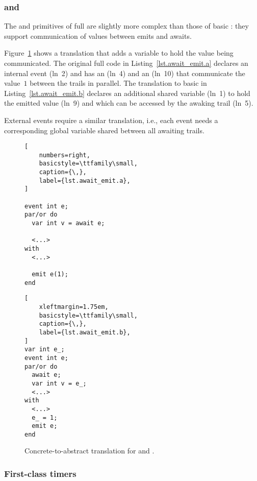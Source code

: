 \subsubsection{ and }

The  and  primitives of full \CEU are slightly more
complex than those of basic \CEU: they support communication of values
between emits and awaits.

Figure~\ref{lst.await_emit} shows a translation that adds a variable to hold
the value being communicated.
%
The original full \CEU code in Listing~\ref{lst.await_emit.a} declares an
internal event  (ln~2) and has an  (ln~4) and an
 (ln~10) that communicate the value~$1$ between the trails in
parallel.
%
The translation to basic \CEU in Listing~\ref{lst.await_emit.b} declares an
additional shared variable  (ln~1) to hold the emitted value
(ln~9) and which can be accessed by the awaking trail (ln~5).

External events require a similar translation, i.e., each event needs a
corresponding global variable shared between all awaiting trails.

\begin{figure}[ht!]
\begin{minipage}[t]{0.48\linewidth}
\begin{lstlisting}[
    numbers=right,
    basicstyle=\ttfamily\small,
    caption={\,},
    label={lst.await_emit.a},
]

event int e;
par/or do
  var int v = await e;

  <...>
with
  <...>

  emit e(1);
end
\end{lstlisting}
\end{minipage}
%
\begin{minipage}[t]{0.45\linewidth}
\begin{lstlisting}[
    xleftmargin=1.75em,
    basicstyle=\ttfamily\small,
    caption={\,},
    label={lst.await_emit.b},
]
var int e_;
event int e;
par/or do
  await e;
  var int v = e_;
  <...>
with
  <...>
  e_ = 1;
  emit e;
end
\end{lstlisting}
\end{minipage}
%
\caption{Concrete-to-abstract translation for  and . }
\label{lst.await_emit}
\end{figure}

\subsubsection{First-class timers}

